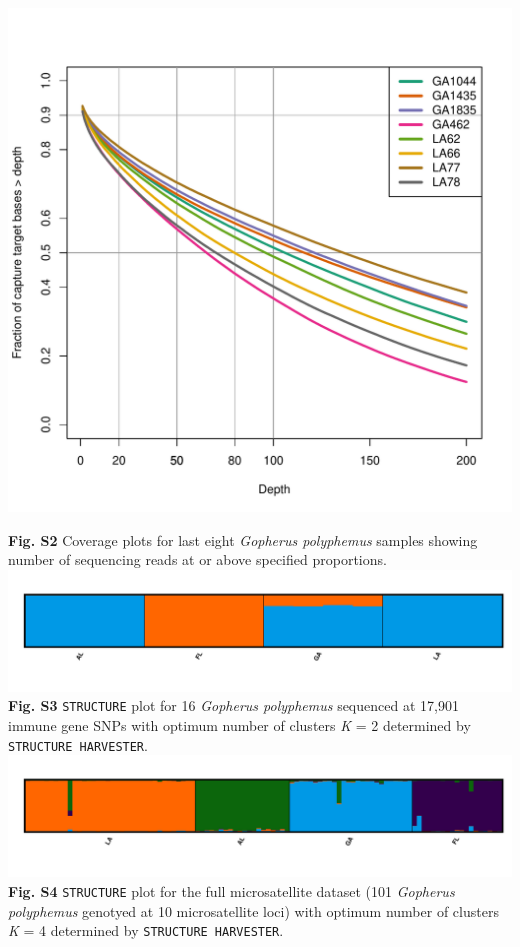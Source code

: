 \documentclass[english]{article}\usepackage[]{graphicx}\usepackage[]{color}
\makeatletter
\def\maxwidth{ %
  \ifdim\Gin@nat@width>\linewidth
    \linewidth
  \else
    \Gin@nat@width
  \fi
}
\newenvironment{knitrout}{}{} %
\makeatother
\begin{document}
\pagebreak{}
\noindent
\begin{knitrout}
\color{fgcolor}
\includegraphics[width=\maxwidth]{figure/Figure-3-1} 

\end{knitrout}
\noindent
\textbf{Fig. S2} Coverage plots for last eight \textit{Gopherus polyphemus} samples showing number of sequencing reads at or above specified proportions.\\


\pagebreak{}
\noindent
\includegraphics [scale=1.0]{K2MajorCluster-snps}
\noindent
\textbf{Fig. S3} \texttt{STRUCTURE} plot for 16 \textit{Gopherus polyphemus} sequenced at 17,901 immune gene SNPs with optimum number of clusters \textit{K} = 2 determined by \texttt{STRUCTURE HARVESTER}.\\

\pagebreak{}
\noindent
\includegraphics [scale=1.0]{structure-results-msats-review-clumpak-k4}
\noindent
\textbf{Fig. S4} \texttt{STRUCTURE} plot for the full microsatellite dataset (101 \textit{Gopherus polyphemus} genotyed at 10 microsatellite loci) with optimum number of clusters \textit{K} = 4 determined by \texttt{STRUCTURE HARVESTER}.\\
\end{document}

